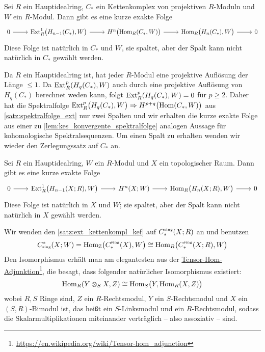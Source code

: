 \begin{satz}[label=satz:ext_kettenkompl_kef,name={Universelles Koeffizienten-Theorem für Kohomologie von Kettenkomplexen}]
	Sei $R$ ein Hauptidealring, $C_*$ ein Kettenkomplex von projektiven $R$-Moduln und $W$ ein $R$-Modul.
	Dann gibt es eine kurze exakte Folge
	\[
		\begin{tikzcd}
			0 \rar & \Ext_R^1 \enbrace[\big]{H_{n-1}(C_*),W} \rar & H^n \enbrace[\big]{\Hom_R(C_*,W)} \rar & \Hom_R \enbrace[\big]{H_n(C_*),W} \rar & 0
		\end{tikzcd}
	\]
	Diese Folge ist natürlich in $C_*$ und $W$, sie spaltet, aber der Spalt kann nicht natürlich in $C_*$ gewählt werden.
\end{satz}
\begin{beweis}
	Da $R$ ein Hauptidealring ist, hat jeder $R$-Modul eine projektive Auflösung der Länge $\le 1$.
	Da $\Ext_R^p \enbrace*{H_q(C_*),W}$ auch durch eine projektive Auflösung von $H_q(C_*)$ berechnet weden kann, folgt $\Ext_R^p \enbrace*{H_q(C_*),W}=0$ für $p \ge 2$.
	Daher hat die Spektralfolge $\Ext_R^p \enbrace[\big]{H_q(C_*),W} \Rightarrow H^{p+q} \enbrace[\big]{\Hom(C_*,W)}$ aus \autoref{satz:spektralfolge_ext} nur zwei Spalten und wir erhalten die kurze exakte Folge aus einer zu \autoref{lem:kes_konvergente_spektralfolge} analogen Aussage für kohomologische Spektralsequenzen.
	Um einen Spalt zu erhalten wenden wir wieder den Zerlegungssatz auf $C_*$ an.
\end{beweis}

\begin{satz}[label=univ_koeff_space,{name={Universelles Koeffizienten-Theorem für Kohomologie von Räumen}}]
	Sei $R$ ein Hauptidealring, $W$ ein $R$-Modul und $X$ ein topologischer Raum.
	Dann gibt es eine kurze exakte Folge
	\[
		\begin{tikzcd}[sep=2.2em]
			0 \rar & \Ext_R^1 \enbrace[\big]{H_{n-1}(X;R),W} \rar & H^n(X;W) \rar & \Hom_R \enbrace[\big]{H_n(X;R),W} \rar & 0
		\end{tikzcd}
	\]
	Diese Folge ist natürlich in $X$ und $W$; sie spaltet, aber der Spalt kann nicht natürlich in $X$ gewählt werden.
\end{satz}
\begin{beweis}
	Wir wenden den \autoref{satz:ext_kettenkompl_kef} auf $C_*^\sing(X;R)$ an und benutzen
	\[
		C_\sing^*(X;W) = \Hom_\mathbb{Z} \enbrace*{C_*^\sing(X),W} \cong \Hom_R \enbrace*{C_*^\sing(X;R),W} 
	\]
	Den Isomorphismus erhält man am elegantesten aus der \href{https://en.wikipedia.org/wiki/Tensor-hom_adjunction}{Tensor-Hom-Adjunktion}\footnote{\url{https://en.wikipedia.org/wiki/Tensor-hom_adjunction}}, die besagt, dass folgender natürlicher Isomorphismus existiert:
	\[
		\Hom_R \enbrace*{Y \otimes_S X, Z} \cong \Hom_S \enbrace[\big]{Y, \Hom_R (X,Z)}
	\]
	wobei $R,S$ Ringe sind, $Z$ ein $R$-Rechtsmodul, $Y$ ein $S$-Rechtsmodul und $X$ ein $(S,R)$-Bimodul ist, das heißt ein $S$-Linksmodul und ein $R$-Rechtsmodul, sodass die Skalarmultiplikationen miteinander verträglich -- also assoziativ -- sind.
\end{beweis}
\newpage

